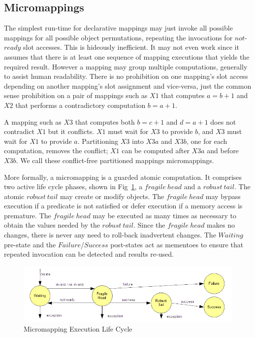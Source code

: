 \documentclass{llncs}
\begin{document}
\subsection{Micromappings}

The simplest run-time for declarative mappings may just invoke all possible mappings for all possible object permutations, repeating the invocations for $not$-$ready$ slot accesses. This is hideously inefficient. It may not even work since it assumes that there is at least one sequence of mapping executions that yields the required result. However a mapping may group multiple computations, generally to assist human readability. There is no prohibition on one mapping's slot access depending on another mapping's slot assignment and vice-versa, just the common sense prohibition on a pair of mappings such as $X1$ that computes $a = b + 1$ and $X2$ that performs a contradictory computation $b = a + 1$.
 
A mapping such as $X3$ that computes both $b = c + 1$ and $d = a + 1$ does not contradict $X1$ but it conflicts. $X1$ must wait for $X3$ to provide $b$, and $X3$ must wait for $X1$ to provide $a$. Partitioning $X3$ into $X3a$ and $X3b$, one for each computation, removes the conflict; $X1$ can be computed after $X3a$ and before $X3b$. We call these conflict-free partitioned mappings micromappings.

More formally, a micromapping is a guarded atomic computation. It comprises two active life cycle phases, shown in Fig~\ref{fig:MicromappingContext}, a $fragile\ head$ and a $robust\ tail$. The atomic $robust\ tail$ may create or modify objects. The $fragile\ head$ may bypass execution if a predicate is not satisfied or defer execution if a memory access is premature. The $fragile\ head$ may be executed as many times as necessary to obtain the values needed by the $robust\ tail$. Since the $fragile\ head$ makes no changes, there is never any need to roll-back inadvertent changes. The $Waiting$ pre-state and the $Failure$/$Success$ post-states act as mementoes to ensure that repeated invocation can be detected and results re-used.

\begin{figure}
  \begin{center}
    \includegraphics[width=4.75in]{MicromappingContext.png}
  \end{center}
  \caption{Micromapping Execution Life Cycle}
  \label{fig:MicromappingContext}
\end{figure}
\end{document}
